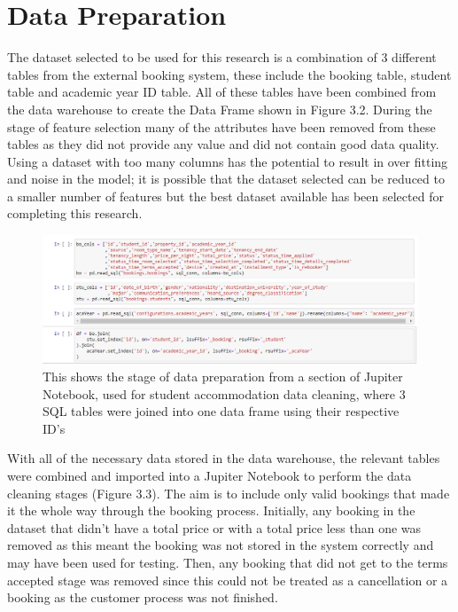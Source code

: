 \section{Data Preparation}

The dataset selected to be used for this research is a combination of 3 different tables from the external booking system, these include the booking table, student table and academic year ID table. All of these tables have been combined from the data warehouse to create the Data Frame shown in Figure 3.2. During the stage of feature selection many of the attributes have been removed from these tables as they did not provide any value and did not contain good data quality. Using a dataset with too many columns has the potential to result in over fitting and noise in the model; it is possible that the dataset selected can be reduced to a smaller number of features but the best dataset available has been selected for completing this research. 

\begin{figure}[H]
 \centering
 \includegraphics[width=15cm]{figures/joining_tables.png}
 \caption{This shows the stage of data preparation from a section of Jupiter Notebook, used for student accommodation data cleaning, where  3 SQL tables were joined into one data frame using their respective ID's}
\end{figure}

With all of the necessary data stored in the data warehouse, the relevant tables were combined and imported into a Jupiter Notebook to perform the data cleaning stages (Figure 3.3). The aim is to include only valid bookings that made it the whole way through the booking process. Initially, any booking in the dataset that didn't have a total price or with a total price less than one was removed as this meant the booking was not stored in the system correctly and may have been used for testing. Then, any booking that did not get to the terms accepted stage was removed since this could not be treated as a cancellation or a booking as the customer process was not finished.

